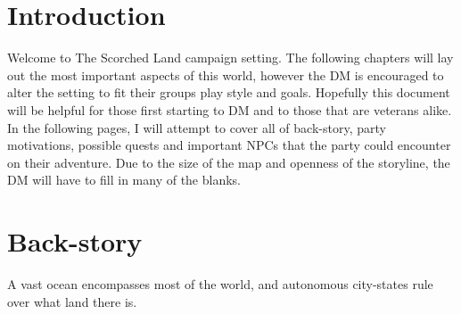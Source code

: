 \documentclass{article}
\begin{document}
\section{Introduction}

Welcome to The Scorched Land campaign setting.  The following chapters will lay 
out the most important aspects of this world, however the DM is encouraged to 
alter the setting to fit their groups play style and goals.  Hopefully this document
will be helpful for those first starting to DM and to those that are veterans
alike.  In the following pages, I will attempt to cover all of back-story, party
motivations, possible quests and important NPCs that the party could encounter on 
their adventure.  Due to the size of the map and openness of the storyline, the 
DM will have to fill in many of the blanks.

\section{Back-story}

A vast ocean encompasses most of the world, and autonomous city-states rule over
what land there is.  
\end{document}
